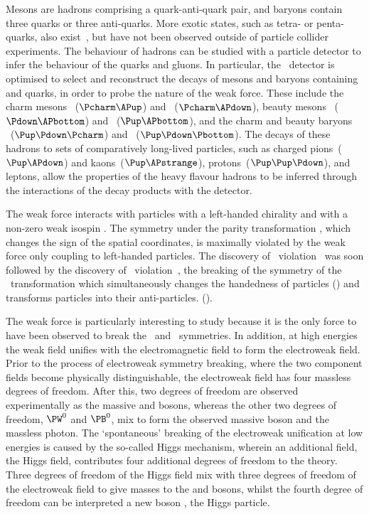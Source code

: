 Mesons are hadrons comprising a quark-anti-quark pair, and baryons contain 
three quarks or three anti-quarks.
More exotic states, such as tetra- or penta-quarks, also 
exist~\cite{Choi:2007wga,Aaij:2014jqa,Aaij:2015tga}, but have not been observed 
outside of particle collider experiments.
The behaviour of hadrons can be studied with a particle detector to infer the 
behaviour of the quarks and gluons.
In particular, the \lhcb\ detector is optimised to select and reconstruct the 
decays of mesons and baryons containing \Pcharm and \Pbottom quarks, in order 
to probe the nature of the weak force.
These include the charm mesons \PDzero~($\Pcharm\APup$) and 
\PDp~($\Pcharm\APdown$), beauty mesons \PBzero~($\Pdown\APbottom$) and 
\PBp~($\Pup\APbottom$), and the charm and beauty baryons 
\PLambdac~($\Pup\Pdown\Pcharm$) and \PLambdab~($\Pup\Pdown\Pbottom$).
The decays of these hadrons to sets of comparatively long-lived particles, such 
as charged pions~($\Pup\APdown$) and kaons~($\Pup\APstrange$), 
protons~($\Pup\Pup\Pdown$), and leptons, allow the properties of the heavy 
flavour hadrons to be inferred through the interactions of the decay products 
with the detector.\footnotemark\


The weak force interacts with particles with a left-handed chirality and with a 
non-zero weak isospin \wisospin.
The symmetry under the parity transformation \Ptransform, which changes the 
sign of the spatial coordinates, is maximally violated by the weak force only 
coupling to left-handed particles.
The discovery of \Ptransform\ violation~\cite{Wu:1957my} was soon followed by 
the discovery of \CP\ violation~\cite{Christenson:1964fg}, the breaking of the 
symmetry of the \CP\ transformation which simultaneously changes the handedness 
of particles (\Ptransform) and transforms particles into their anti-particles.  
(\Ctransform).

The weak force is particularly interesting to study because it is the only 
force to have been observed to break the \Ptransform\ and \CP\ symmetries.
In addition, at high energies the weak field unifies with the electromagnetic 
field to form the electroweak field.
Prior to the process of electroweak symmetry breaking, where the two component 
fields become physically distinguishable, the electroweak field has four 
massless degrees of freedom.
After this, two degrees of freedom are observed experimentally as the massive 
\PWp and \PWm bosons, whereas the other two degrees of freedom, $\PW^{0}$ and 
$\PB^{0}$, mix to form the observed massive \PZ boson and the massless photon.
The `spontaneous' breaking of the electroweak unification at low energies is 
caused by the so-called Higgs mechanism, wherein an additional field, the Higgs
field, contributes four additional degrees of freedom to the theory.
Three degrees of freedom of the Higgs field mix with three degrees of freedom 
of the electroweak field to give masses to the \PWpm and \PZ bosons, whilst the 
fourth degree of freedom can be interpreted a new boson \PH, the Higgs 
particle.

